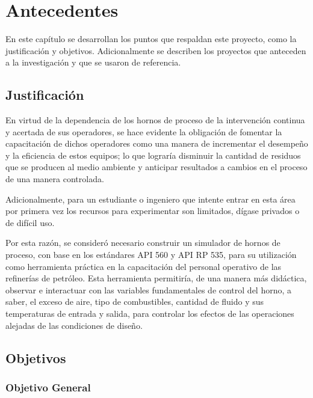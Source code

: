 \chapter{Antecedentes}

\par En este capítulo se desarrollan los puntos que respaldan este proyecto, como la justificación y objetivos. Adicionalmente se describen los proyectos que anteceden a la investigación y que se usaron de referencia.

\section{Justificación}

\par En virtud de la dependencia de los hornos de proceso de la intervención continua y acertada de sus operadores, se hace evidente la obligación de fomentar la capacitación de dichos operadores como una manera de incrementar el desempeño y la eficiencia de estos equipos; lo que lograría disminuir la cantidad de residuos que se producen al medio ambiente y anticipar resultados a cambios en el proceso de una manera controlada.

\par Adicionalmente, para un estudiante o ingeniero que intente entrar en esta área por primera vez los recursos para experimentar son limitados, dígase privados o de difícil uso.

\par Por esta razón, se consideró necesario construir un simulador de hornos de proceso, con base en los estándares API 560\cite{bib:api560} y API RP 535\cite{bib:api535}, para su utilización como herramienta práctica en la capacitación del personal operativo de las refinerías de petróleo. Esta herramienta permitiría, de una manera más didáctica, observar e interactuar con las variables fundamentales de control del horno, a saber, el exceso de aire, tipo de combustibles, cantidad de fluido y sus temperaturas de entrada y salida, para controlar los efectos de las operaciones alejadas de las condiciones de diseño.

\section{Objetivos}

\subsection{Objetivo General}

